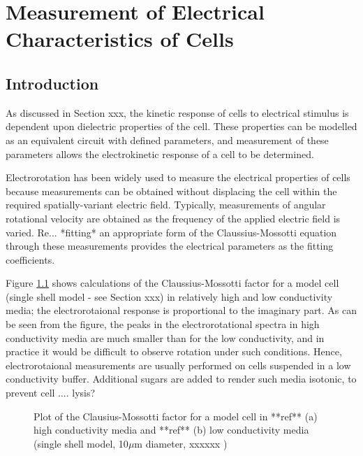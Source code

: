 \chapter{Measurement of Electrical Characteristics of Cells} 
\label{Chapter:Measurement of Electrical Characteristics of Cells}

\section{Introduction}
As discussed in Section xxx, the kinetic response of cells to electrical stimulus is dependent upon dielectric properties of the cell. These properties can be modelled as an equivalent circuit with defined parameters, and measurement of these parameters allows the electrokinetic response of a cell to be determined.

Electrorotation has been widely used to measure the electrical properties of cells because measurements can be obtained without displacing the cell within the required spatially-variant electric field. Typically, measurements of angular rotational velocity are obtained as the frequency of the applied electric field is varied. Re... *fitting* an appropriate form of the Claussius-Mossotti equation through these measurements provides the electrical parameters as the fitting coefficients.

Figure \ref{fig:CM_factor_model_cell_high_low_cond} shows calculations of the Claussius-Mossotti factor for a model cell (single shell model - see Section xxx) in relatively high and low conductivity media; the electrorotaional response is proportional to the imaginary part. As can be seen from the figure, the peaks in the electrorotational spectra in high conductivity media are much smaller than for the low conductivity, and in practice it would be difficult to observe rotation under such conditions. Hence, electrorotaional measurements are usually performed on cells suspended in a low conductivity buffer. Additional sugars are added to render such media isotonic, to prevent cell .... lysis?

\begin{figure}
 \centering
 \subfigure[]{
 \label{fig:CM_factor_model_cell_low_cond}
 }
 \subfigure[]{
 \label{fig:CM_factor_model_cell_low_cond}
}
 \label{fig:CM_factor_model_cell_high_low_cond}
 \caption{Plot of the Clausius-Mossotti factor for a model cell in **ref** (a) high conductivity media and **ref** (b) low conductivity media (single shell model, 10$\mu$m diameter, xxxxxx )}
\end{figure}


